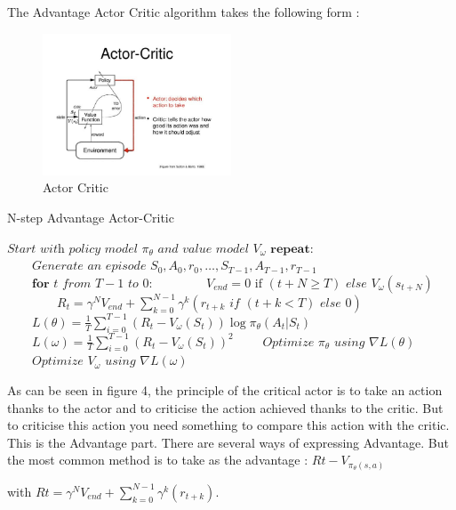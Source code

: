 The Advantage Actor Critic algorithm takes the following form :

\begin{figure}[H]
    \centering
    \includegraphics[width=0.5\textwidth]{imgs/actor_critic.jpeg}
    \caption{\label{fig:method} Actor Critic}
\end{figure}

\begin{algorithm}
\label{alga2c}
\caption{N-step Advantage Actor-Critic\label{a2c}}
\begin{algorithmic}[1]
\State $\textit{Start with policy model } \pi_\theta \textit{ and value model } V_\omega$
\State $\textbf{repeat:}$
\State $\qquad\textit{Generate an episode } S_0, A_0, r_0, \ldots, S_{T-1}, A_{T-1}, r_{T-1} $
\State $\qquad\textbf{for } t \textit{ from } T-1 \textit{ to } 0$:
\State $\qquad\qquad V_{end} = 0 \text{ if } (t+N \geq T) \textit{ else } V_\omega(s_{t+N})$
\State $\qquad\qquad R_t =\gamma^{N}V_{end}+\sum_{k=0}^{N-1} \gamma^k \left(r_{t+k} \textit{ if } (t+k < T) \textit{ else } 0\right)$ 
\State $\qquad L(\theta) = \frac{1}{T} \sum_{i=0}^{T-1} (R_t - V_\omega(S_t)) \log \pi_\theta(A_t | S_t)$
\State $\qquad L(\omega) = \frac{1}{T} \sum_{i=0}^{T-1} (R_t - V_\omega(S_t))^2$
\State $\qquad\textit{Optimize } \pi_\theta \textit{ using } \nabla L(\theta)$
\State $\qquad\textit{Optimize } V_\omega \textit{ using } \nabla L(\omega)$
\EndProcedure
\end{algorithmic}
\end{algorithm}
As can be seen in figure 4, the principle of the critical actor is to take an action thanks to the actor and to criticise the action achieved thanks to the critic. But to criticise this action you need something to compare this action with the critic. This is the Advantage part. 
There are several ways of expressing Advantage.
But the most common method is to take as the advantage :  $Rt - V_{\pi_{\theta}(s,a)}$

with $Rt =\gamma^{N}V_{end}+\sum_{k=0}^{N-1} \gamma^k (r_{t+k})$.


